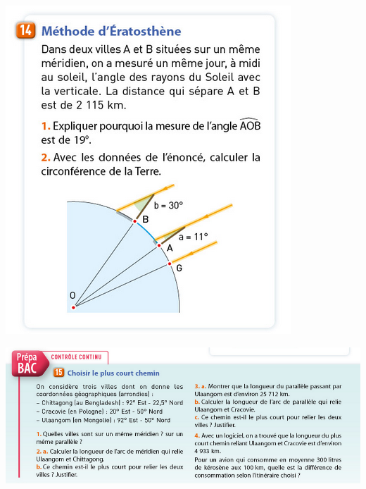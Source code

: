 \documentclass[10pt]{article}
\newcommand{\myscale}{0.57}
\begin{document}
\begin{center}
	\includegraphics[scale=\myscale]{assets/14.png}

	\includegraphics[scale=\myscale]{assets/bac.png}
\end{center}
\end{document}
